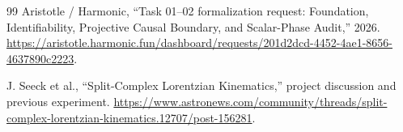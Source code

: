 \documentclass[11pt,a4paper]{article}
\begin{document}
\begin{thebibliography}{99}
Aristotle / Harmonic,
``Task 01--02 formalization request: Foundation, Identifiability, Projective Causal Boundary, and Scalar-Phase Audit,'' 2026.
\url{https://aristotle.harmonic.fun/dashboard/requests/201d2dcd-4452-4ae1-8656-4637890c2223}.

J. Seeck et al.,
``Split-Complex Lorentzian Kinematics,'' project discussion and previous experiment.
\url{https://www.astronews.com/community/threads/split-complex-lorentzian-kinematics.12707/post-156281}.

\end{thebibliography}
\end{document}
